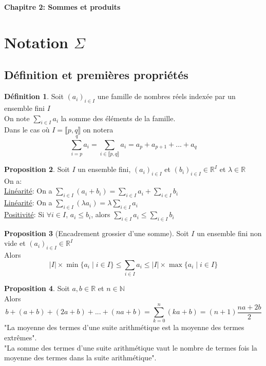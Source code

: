 \documentclass[10pt,a4paper]{article}
\theoremstyle{definition}
\newtheorem{proposition}{Proposition}[section]
\newtheorem{definition}[proposition]{Définition}
\begin{document}
\renewcommand{\labelitemi}{$*$}
\renewcommand{\labelenumi}{(\roman{enumi})}
\begin{center}
{\Large \textbf{Chapitre 2: Sommes et produits}}
\end{center}

\section{Notation $\Sigma$}
\subsection{Définition et premières propriétés}
\begin{definition}
Soit $(a_i)_{i \in I}$ une famille de nombres réels indexée par un ensemble fini $I$ \\
On note $\sum\limits_{i \in I} a_i$ la somme des éléments de la famille. \\
Dans le cas où $I = \llbracket p, q \rrbracket$ on notera
\[ \sum_{i = p}^q a_i = \sum_{i \in \llbracket p, q \rrbracket} a_i = a_p + a_{p + 1} + ... + a_q \]
\end{definition}
\begin{proposition}
Soit $I$ un ensemble fini, $(a_i)_{i \in I}$ et $(b_i)_{i \in I} \in \mathbb{R}^I$ et $\lambda \in \mathbb{R}$ \\
On a: \\
\uline{Linéarité}: On a $\sum\limits_{i \in I} (a_i + b_i) = \sum\limits_{i \in I} a_i + \sum\limits_{i \in I} b_i$ \\
\uline{Linéarité}: On a $\sum\limits_{i \in I} (\lambda a_i) = \lambda \sum\limits_{i \in I} a_i$ \\
\uline{Positivité}: Si $\forall i \in I$, $a_i \leq b_i$, alors $\sum\limits_{i \in I} a_i \leq \sum\limits_{i \in I} b_i$
\end{proposition}
\begin{proposition}[Encadrement grossier d'une somme]
Soit $I$ un ensemble fini non vide et $(a_i)_{i \in I} \in \mathbb{R}^I$ \\
Alors
\[ |I| \times \min\{ a_i \mid i \in I \} \leq \sum_{i \in I} a_i \leq |I| \times \max\{ a_i \mid i \in I \} \]
\end{proposition}
\begin{proposition}
Soit $a, b \in \mathbb{R}$ et $n \in \mathbb{N}$ \\
Alors 
\[ b + (a + b) + (2a + b) + ... + (na + b) = \sum_{k = 0}^n (ka + b) = (n + 1) \frac{na + 2b}{2} \]
"La moyenne des termes d'une suite arithmétique est la moyenne des termes extrêmes". \\
"La somme des termes d'une suite arithmétique vaut le nombre de termes fois la moyenne des termes dans la suite arithmétique".
\end{proposition}
\end{document}
